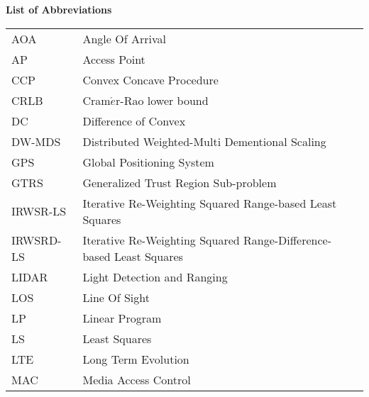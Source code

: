 \newpage


\phantom{m}

\begin{flushleft}
\begin{Huge}
\textbf{List of Abbreviations}
\end{Huge}
\end{flushleft}

\phantom{m}

\begin{longtable}[h]{l l}

AOA & Angle Of Arrival\\

AP & Access Point \\

CCP & Convex Concave Procedure \\

CRLB & Cram$\acute{e}$r-Rao  lower  bound \\

DC & Difference of Convex \\

DW-MDS & Distributed Weighted-Multi Dementional Scaling \\

GPS & Global Positioning System \\

GTRS & Generalized Trust Region Sub-problem \\

IRWSR-LS & Iterative Re-Weighting Squared Range-based Least Squares \\

IRWSRD-LS & Iterative Re-Weighting Squared Range-Difference-based Least Squares\\

LIDAR & Light Detection and Ranging\\

LOS & Line Of Sight \\

LP & Linear Program \\

LS & Least Squares \\

LTE & Long Term Evolution \\

MAC & Media Access Control\\


\end{longtable}

